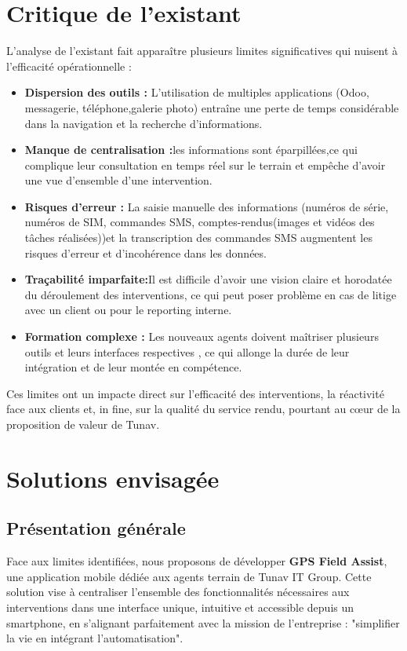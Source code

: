 \documentclass[12pt,a4paper]{report}
\begin{document}
    \section{Critique de l'existant}
    \noindent L'analyse de l'existant fait apparaître plusieurs limites significatives qui nuisent à l'efficacité opérationnelle :
    \begin{itemize}
        \item \textbf{ Dispersion des outils :} L'utilisation de multiples applications (Odoo, messagerie, téléphone,galerie photo) entraîne une perte de temps considérable dans la navigation et la recherche d'informations.
        \item \textbf{Manque de centralisation :}les informations sont éparpillées,ce qui complique leur consultation en temps réel sur le terrain et empêche d'avoir une vue d'ensemble d'une intervention.
        \item \textbf{Risques d'erreur :} La saisie manuelle des informations (numéros de série, numéros de SIM, commandes SMS, comptes-rendus(images et vidéos des tâches réalisées))et la transcription des commandes SMS augmentent les risques d'erreur et d'incohérence dans les données.
        \item \textbf{Traçabilité imparfaite:}Il est difficile d'avoir une vision claire et horodatée du déroulement des interventions, ce qui peut poser problème en cas de litige avec un client ou pour le reporting interne.
        \item \textbf{Formation complexe :} Les nouveaux agents doivent maîtriser plusieurs outils et leurs interfaces respectives , ce qui allonge la durée  de leur intégration et de leur montée en compétence.
        
        
    \end{itemize}
    \noindent Ces limites ont un impacte direct sur l'efficacité des interventions, la réactivité face aux clients et, in fine, sur la qualité du service rendu, pourtant au cœur de la proposition de valeur de Tunav. 
    \section{Solutions envisagée }
   \subsection{ Présentation générale}       
\noindent Face aux limites identifiées, nous proposons de développer  
\textbf {GPS Field Assist}, une application mobile dédiée aux agents terrain de Tunav IT Group. Cette solution vise à centraliser l'ensemble des fonctionnalités nécessaires  aux interventions dans une interface unique, intuitive et accessible depuis un smartphone, en s'alignant  parfaitement avec la mission de l'entreprise :  "simplifier la vie en intégrant l’automatisation".
\end{document}
